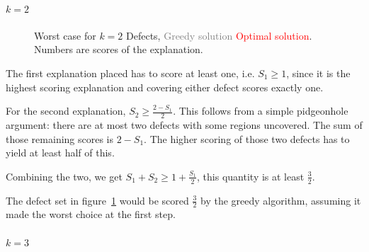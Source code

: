 \paragraph{\textbf{$k=2$}} 

\begin{figure}[ht!] \centering
{} 
\caption{Worst case for $k=2$ Defects, \textcolor{gray}{Greedy solution} \textcolor{red}{Optimal solution}.  Numbers are scores of the explanation.}
\label{fig:k2}
\end{figure}

The first explanation placed has to score at least one, i.e. $S_1 \geq 1$, since it is the highest scoring explanation and covering either defect scores exactly one.  

For the second explanation, $S_2 \geq \frac{2 - S_1}{2}$.  This follows from a simple pidgeonhole argument: there are at most two defects with some regions uncovered.  The sum of those remaining scores is $2 - S_1$.  The higher scoring of those two defects has to yield at least half of this.  

Combining the two, we get $S_1 + S_2 \geq 1 + \frac{S_1}{2}$, this quantity is at least $\frac32$. 

The defect set in figure~\ref{fig:k2} would be scored $\frac32$ by the greedy algorithm, assuming it made the worst choice at the first step.

\paragraph{\textbf{$k=3$}} 


